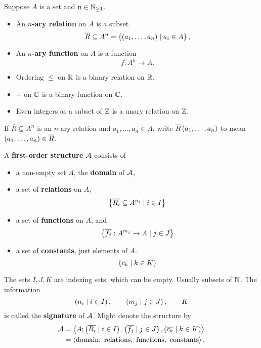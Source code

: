 \begin{definition}
Suppose $ A $ is a set and $ n \in \N_{\ge 1} $.
\begin{itemize}
\item An \textbf{$ n $-ary relation} on $ A $ is a subset
$$ \overline{R} \subseteq A^n = \cb{\rb{a_1, \dots, a_n} \mid a_i \in A}, $$
\item An \textbf{$ n $-ary function} on $ A $ is a function
$$ \overline{f} : A^n \to A. $$
\end{itemize}
\end{definition}

\begin{example2}
\hfill
\begin{itemize}
\item Ordering $ \le $ on $ \R $ is a binary relation on $ \R $.
\item $ + $ on $ \C $ is a binary function on $ \C $.
\item Even integers as a subset of $ \Z $ is a unary relation on $ \Z $.
\end{itemize}
\end{example2}

\begin{notation2}
If $ \overline{R} \subseteq A^n $ is an $ n $-ary relation and $ a_1, \dots, a_n \in A $, write $ \overline{R}\rb{a_1, \dots, a_n} $ to mean $ \rb{a_1, \dots, a_n} \in \overline{R} $.
\end{notation2}

\begin{definition}
A \textbf{first-order structure} $ \AA $ consists of
\begin{itemize}
\item a non-empty set $ A $, the \textbf{domain} of $ \AA $,
\item a set of \textbf{relations} on $ A $,
$$ \cb{\overline{R_i} \subseteq A^{n_i} \mid i \in I} $$
\item a set of \textbf{functions} on $ A $, and
$$ \cb{\overline{f_j} : A^{m_j} \to A \mid j \in J} $$
\item a set of \textbf{constants}, just elements of $ A $.
$$ \cb{\overline{c_k} \mid k \in K} $$
\end{itemize}
The sets $ I, J, K $ are indexing sets, which can be empty. Usually subsets of $ \N $. The information
$$ \rb{n_i \mid i \in I}, \qquad \rb{m_j \mid j \in J}, \qquad K $$
is called the \textbf{signature} of $ \AA $. Might denote the structure by
\begin{align*}
\AA
& = \ab{A; \rb{\overline{R_i} \mid i \in I}, \rb{\overline{f_j} \mid j \in J}, \rb{\overline{c_k} \mid k \in K}} \\
& = \ab{\text{domain}; \ \text{relations}, \ \text{functions}, \ \text{constants}}.
\end{align*}
\end{definition}

